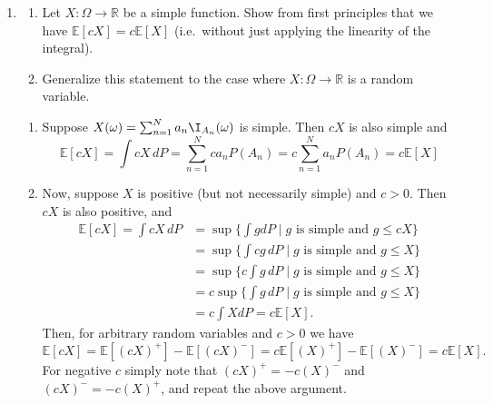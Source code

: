 \begin{enumerate}[resume*]
    \item
    \begin{enumerate}
        \item %
        Let $X: \Omega \rightarrow \mathbb{R}$ be a simple function. Show from first principles that we have $\mathbb{E}[cX] = c\mathbb{E}[X]$ (i.e.\ without just applying the linearity of the integral).
        \item %
        Generalize this statement to the case where $X : \Omega \rightarrow \mathbb{R}$ is a random variable.
    \end{enumerate}
    \begin{ungradedsolution}
        \begin{enumerate}
            \item Suppose $X(\omega) = \sum_{n=1}^N a_n \I_{A_n}(\omega)$ is simple. Then $cX$ is also simple and
            \begin{equation*}
                \mathbb{E}[cX] = \int cX \,dP = \sum_{n=1}^N c a_n P(A_n) = c \sum_{n=1}^N a_n P(A_n) = c \mathbb{E}[X]
            \end{equation*}
            \item Now, suppose $X$ is positive (but not necessarily simple) and $c>0$. Then $cX$ is also positive, and
            \begin{align*}
                \mathbb{E}[cX] = \int cX \,dP & = \sup \{ \int g dP \mid g \text{ is simple and } g \leq cX \}    \\
                                              & =  \sup \{ \int cg \,dP \mid g \text{ is simple and } g \leq X \} \\
                                              & =  \sup \{c \int g \,dP \mid g \text{ is simple and } g \leq X \} \\
                                              & = c \sup \{\int g \,dP \mid g \text{ is simple and } g \leq X \}  \\
                                              & = c \int X dP = c \mathbb{E}[X].
            \end{align*}
            Then, for arbitrary random variables and $c>0$ we have
            \begin{equation*}
                \mathbb{E}[cX] = \mathbb{E}[(cX)^+] - \mathbb{E}[(cX)^-] = c \mathbb{E}[(X)^+] - \mathbb{E}[(X)^-] = c \mathbb{E}[X].
            \end{equation*}
            For negative $c$ simply note that $(cX)^+ = -c(X)^-$ and $(cX)^- = -c(X)^+$, and repeat the above argument.
        \end{enumerate}
    \end{ungradedsolution}
\end{enumerate}
